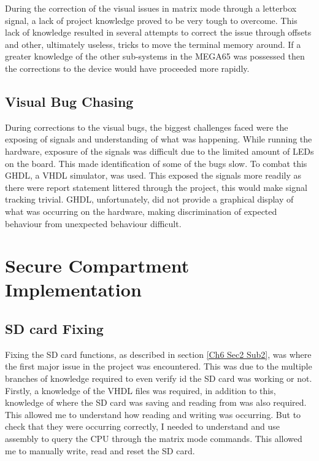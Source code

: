 During the correction of the visual issues in matrix mode through a letterbox signal, a lack of project knowledge proved to be very tough to overcome. This lack of knowledge resulted in several attempts to correct the issue through offsets and other, ultimately useless, tricks to move the terminal memory around. If a greater knowledge of the other sub-systems in the MEGA65 was possessed then the corrections to the device would have proceeded more rapidly.

\subsection{Visual Bug Chasing}

\label{Ch7 Sec1 Sub4}

During corrections to the visual bugs, the biggest challenges faced were the exposing of signals and understanding of what was happening. While running the hardware, exposure of the signals was difficult due to the limited amount of LEDs on the board. This made identification of some of the bugs slow. To combat this GHDL, a VHDL simulator, was used. This exposed the signals more readily as there were report statement littered through the project, this would make signal tracking trivial. GHDL, unfortunately, did not provide a graphical display of what was occurring on the hardware, making discrimination of expected behaviour from unexpected behaviour difficult.


\section{Secure Compartment Implementation}

\label{Ch7 Sec2}

\subsection{SD card Fixing}

\label{Ch7 Sec2 Sub1}

Fixing the SD card functions, as described in section \ref{Ch6 Sec2 Sub2}, was where the first major issue in the project was encountered. This was due to the multiple branches of knowledge required to even verify id the SD card was working or not. Firstly, a knowledge of the VHDL files was required, in addition to this, knowledge of where the SD card was saving and reading from was also required. This allowed me to understand how reading and writing was occurring. But to check that they were occurring correctly, I needed to understand and use assembly to query the CPU through the matrix mode commands. This allowed me to manually write, read and reset the SD card.


